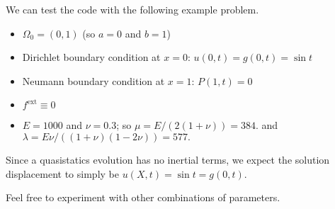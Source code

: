 \documentclass{article}
\begin{document}
We can test the code with the following example problem.

\begin{itemize}
\item \(\Omega_0 = (0,1)\) (so \(a = 0\) and \(b = 1\))
\item Dirichlet boundary condition at \(x = 0\): \(u(0,t) = g(0,t) = \sin t\)
\item Neumann boundary condition at \(x = 1\): \(P(1,t) = 0\)
\item \(f^{\text{ext}} \equiv 0\)
\item \(E = 1000\) and \(\nu = 0.3\); so \(\mu = E / (2 (1 + \nu)) = 384.\) and \(\lambda = E \nu / ((1 + \nu) (1 - 2\nu)) = 577.\)
\end{itemize}

Since a quasistatics evolution has no inertial terms, we expect the solution displacement to simply be \(u(X,t) = \sin t = g(0,t)\).

Feel free to experiment with other combinations of parameters.
\end{document}
